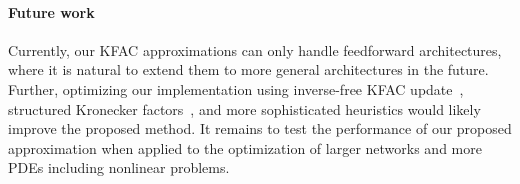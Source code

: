 \paragraph{Future work}
Currently, our KFAC approximations can only handle feedforward architectures, where it is natural to extend them to more general architectures in the future. 
Further, optimizing our implementation using inverse-free KFAC update~\citep{lin2023simplifying}, structured Kronecker factors~\citep{lin2023structured}, and more sophisticated heuristics would likely improve the proposed method. 
It remains to test the performance of our proposed approximation when applied to the optimization of larger networks and more PDEs including nonlinear problems. 






